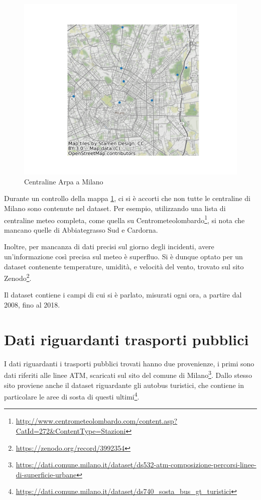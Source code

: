 \documentclass[a4paper]{report}
\begin{document}
\begin{figure}
    \includegraphics[width=\linewidth]{../src/meteo/centraline_arpa.png}
    \caption{Centraline Arpa a Milano}
    \label{fig:centraline-arpa}
\end{figure}

Durante un controllo della mappa \ref{fig:centraline-arpa}, ci si è accorti 
che non tutte le centraline di Milano sono contenute nel dataset.
Per esempio, utilizzando una lista di centraline meteo completa, come quella su 
Centrometeolombardo\footnote{\url{http://www.centrometeolombardo.com/content.asp?CatId=272&ContentType=Stazioni}}, 
si nota che mancano quelle di Abbiategrasso Sud e Cardorna.

Inoltre, per mancanza di dati precisi sul giorno degli incidenti, avere un'informazione così 
precisa sul meteo è superfluo.
Si è dunque optato per un dataset contenente temperature, umidità, e velocità del vento, 
trovato sul sito Zenodo\footnote{\url{https://zenodo.org/record/3992354}}.

Il dataset contiene i campi di cui si è parlato, misurati ogni ora, a partire dal 2008, 
fino al 2018.

\section{Dati riguardanti trasporti pubblici}

I dati riguardanti i trasporti pubblici trovati hanno due provenienze, i primi sono 
dati riferiti alle linee ATM, scaricati sul sito del comune di 
Milano\footnote{\url{https://dati.comune.milano.it/dataset/ds532-atm-composizione-percorsi-linee-di-superficie-urbane}}.
Dallo stesso sito proviene anche il dataset riguardante gli autobus turistici, che 
contiene in particolare le aree di sosta di questi 
ultimi\footnote{\url{https://dati.comune.milano.it/dataset/ds740_sosta_bus_gt_turistici}}.
\end{document}
